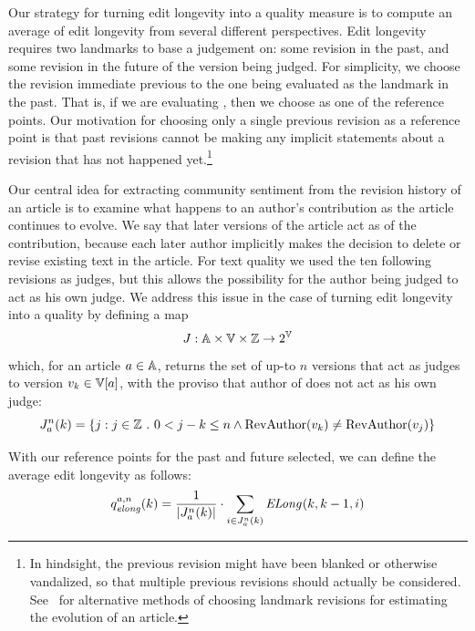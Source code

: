 Our strategy for turning edit longevity into a quality measure
is to compute an average of edit longevity from several different
perspectives.
Edit longevity requires two landmarks to base a judgement on:
some revision in the past, and some revision in the future of
the version being judged.
For simplicity, we choose the revision immediate previous to
the one being evaluated as the landmark in the past.
That is, if we are evaluating , then we choose
 as one of the reference points.
Our motivation for choosing only a single previous revision
as a reference point is that past revisions cannot be making
any implicit statements about a revision that has not happened
yet.\footnote{In hindsight, the previous revision might have been
blanked or otherwise vandalized, so that multiple previous revisions
should actually be considered.
See~\cite{Chatterjee2008} for alternative methods of choosing
landmark revisions for estimating the evolution of an article.}

Our central idea for extracting community sentiment from the
revision history of an article is to examine what happens to an
author's contribution as the article continues to evolve.
We say that later versions of the article act as 
of the contribution, because each later author implicitly makes
the decision to delete or revise existing text in the article.
For text quality we used the ten following revisions as judges,
but this allows the possibility for the author being judged
to act as his own judge.
We address this issue in the case of turning edit longevity into
a quality by defining a map
\begin{equation*}
J : \articles \times \versions{} \times \mathbb{Z} \to 2^\versions{}
\end{equation*}
which, for an article $a \in \mathbb{A}$,
returns the set of up-to $n$ versions that act as judges
to version $\version{k} \in \versions{a}$, with the proviso
that author of  does not act as his own judge:
\begin{equation}
\judges{a}{n}{k} = \{ j : j \in \mathbb{Z}~.~0 < j - k \le n
    \wedge \revauthor{\version{k}} \ne \revauthor{\version{j}} \}
\label{def:judges}
\end{equation}

With our reference points for the past and future selected, we
can define the average edit longevity as follows:
\begin{equation}
\quality{elong}{a,n}{k} = \frac{1}{|\judges{a}{n}{k}|} \cdot
      \sum_{i \in \judges{a}{n}{k}} \esurv{}{k,k-1,i}
\label{def:elong}
\end{equation}

